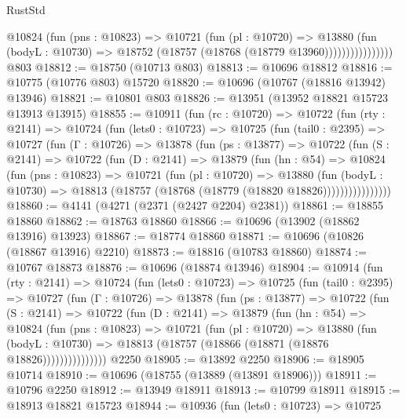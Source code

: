\begin{lexlean}{RustStd}
\begin{coremodule}
                      @10824
                        (fun (pns : @10823) =>
                        @10721
                          (fun (pl : @10720) =>
                          @13880
                            (fun (bodyL : @10730) =>
                            @18752 (@18757 (@18768 (@18779 @13960))))))))))))))))
    @803
@18812 := @18750 (@10713 @803)
@18813 := @10696 @18812
@18816 := @10775 (@10776 @803) @15720
@18820 := @10696 (@10767 (@18816 @13942) @13946)
@18821 := @10801 @803
@18826 := @13951 (@13952 @18821 @15723 @13913 @13915)
@18855 := @10911
    (fun (rc : @10720) =>
    @10722
      (fun (rty : @2141) =>
      @10724
        (fun (lets0 : @10723) =>
        @10725
          (fun (tail0 : @2395) =>
          @10727
            (fun (Γ : @10726) =>
            @13878
              (fun (ps : @13877) =>
              @10722
                (fun (S : @2141) =>
                @10722
                  (fun (D : @2141) =>
                  @13879
                    (fun (hn : @54) =>
                    @10824
                      (fun (pns : @10823) =>
                      @10721
                        (fun (pl : @10720) =>
                        @13880
                          (fun (bodyL : @10730) =>
                          @18813 (@18757 (@18768 (@18779 (@18820 @18826))))))))))))))))
@18860 := @4141 (@4271 (@2371 (@2427 @2204) @2381))
@18861 := @18855 @18860
@18862 := @18763 @18860
@18866 := @10696 (@13902 (@18862 @13916) @13923)
@18867 := @18774 @18860
@18871 := @10696 (@10826 (@18867 @13916) @2210)
@18873 := @18816 (@10783 @18860)
@18874 := @10767 @18873
@18876 := @10696 (@18874 @13946)
@18904 := @10914
    (fun (rty : @2141) =>
    @10724
      (fun (lets0 : @10723) =>
      @10725
        (fun (tail0 : @2395) =>
        @10727
          (fun (Γ : @10726) =>
          @13878
            (fun (ps : @13877) =>
            @10722
              (fun (S : @2141) =>
              @10722
                (fun (D : @2141) =>
                @13879
                  (fun (hn : @54) =>
                  @10824
                    (fun (pns : @10823) =>
                    @10721
                      (fun (pl : @10720) =>
                      @13880
                        (fun (bodyL : @10730) =>
                        @18813 (@18757 (@18866 (@18871 (@18876 @18826)))))))))))))))
    @2250
@18905 := @13892 @2250
@18906 := @18905 @10714
@18910 := @10696 (@18755 (@13889 (@13891 @18906)))
@18911 := @10796 @2250
@18912 := @13949 @18911
@18913 := @10799 @18911
@18915 := @18913 @18821 @15723
@18944 := @10936
    (fun (lets0 : @10723) =>
    @10725

\end{coremodule}
\end{lexlean}
